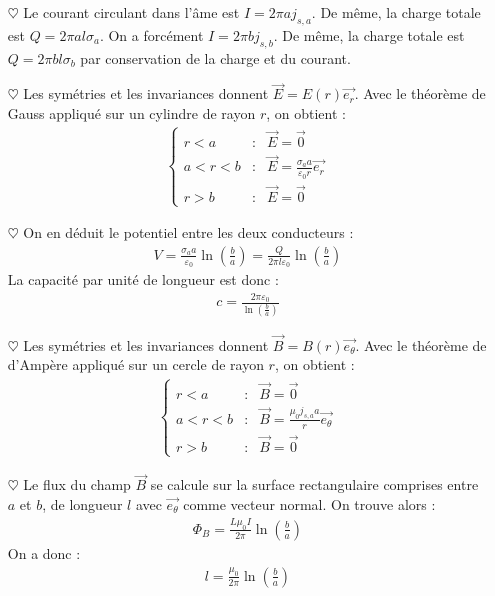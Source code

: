 \documentclass{report}
\begin{document}
\begin{itemize}

	\item[$\heartsuit$] Le courant circulant dans l'âme est $I=2\pi a j_{s,a}$. De même, la charge totale est $Q=2\pi a l \sigma_a$. On a forcément $I=2\pi b j_{s,b}$. De même, la charge totale est $Q=2\pi b l \sigma_b$ par conservation de la charge et du courant. 
	
	\item[$\heartsuit$] Les symétries et les invariances donnent $\vec{E}=E(r)\vec{e_r}$. Avec le théorème de Gauss appliqué sur un cylindre de rayon $r$, on obtient :
	\begin{align*}
	\left\lbrace
	\begin{array}{ccc}
	r<a & : & \vec{E}=\vec{0} \\
	a<r<b & : & \vec{E} = \frac{\sigma_a a}{\varepsilon_0 r}\vec{e_r} \\
	r>b & : & \vec{E}=\vec{0}
	\end{array}\right.
\end{align*}

	\item[$\heartsuit$] On en déduit le potentiel entre les deux conducteurs :
	\begin{align*}
		V=\frac{\sigma_aa}{\varepsilon_0}\ln\left(\frac{b}{a} \right) =\frac{Q}{2\pi l\varepsilon_0}\ln\left(\frac{b}{a} \right)
	\end{align*}
La capacité par unité de longueur est donc :
\begin{align*}
	c = \frac{2\pi\varepsilon_0}{\ln\left(\frac{b}{a} \right)}
\end{align*}

	\item[$\heartsuit$] Les symétries et les invariances donnent $\vec{B}=B(r)\vec{e_\theta}$. Avec le théorème de d'Ampère appliqué sur un cercle de rayon $r$, on obtient :
	\begin{align*}
	\left\lbrace
	\begin{array}{ccc}
	r<a & : & \vec{B}=\vec{0} \\
	a<r<b & : & \vec{B} = \frac{\mu_0j_{s,a} a}{r}\vec{e_\theta} \\
	r>b & : & \vec{B}=\vec{0}
	\end{array}\right.
\end{align*}

	\item[$\heartsuit$] Le flux du champ $\vec{B}$ se calcule sur la surface rectangulaire comprises entre $a$ et $b$, de longueur $l$ avec $\vec{e_\theta}$ comme vecteur normal. On trouve alors :
	\begin{align*}
		\Phi_B=\frac{L\mu_0I}{2\pi}\ln\left(\frac{b}{a} \right)
	\end{align*}
	On a donc :
	\begin{align*}
		l=\frac{\mu_0}{2\pi}\ln\left(\frac{b}{a} \right)
	\end{align*}


\end{itemize}
\end{document}
